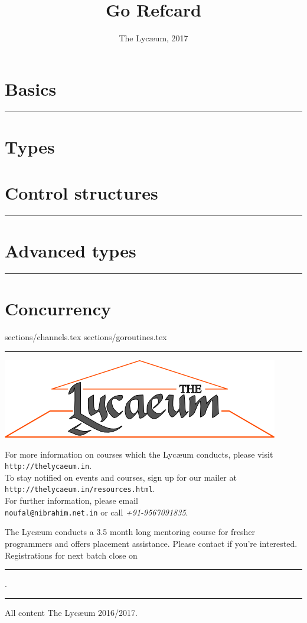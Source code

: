 \documentclass{../refsheet}
\title{Go Refcard}
\author{The Lyc\ae{}um, 2017}
\date{}
\begin{document}
\maketitle
\section{Basics}





\noindent\rule{\linewidth}{0.05ex}
\section{Types}


\section{Control structures}





\noindent\rule{\linewidth}{0.05ex}
\section{Advanced types}




\noindent\rule{\linewidth}{0.05ex}
\section{Concurrency}
 {sections/channels.tex}
 {sections/goroutines.tex}

\noindent\rule{\linewidth}{0.05ex}
\begin{center}
\includegraphics[scale=0.4]{../images/parthenon-callig.png}
\end{center}
For more information on courses which the Lyc\ae{}um conducts, please
visit \texttt{http://thelycaeum.in}. \\To stay notified on events and
courses, sign up for our mailer at \texttt{http://thelycaeum.in/resources.html}. \\For further
information, please email \\\texttt{noufal@nibrahim.net.in} or call
\textit{+91-9567091835}.
\vspace{0.5cm}

The Lyc\ae{}um conducts a 3.5 month long mentoring course for fresher
programmers and offers placement assistance. Please contact if you're
interested. Registrations for next batch close on \rule{4cm}{0.1ex}.

\textcolor{lightgray}{\noindent\rule{\linewidth}{0.05ex}}
\footnotesize All content \textcopyright The Lyc\ae{}um 2016/2017. \tiny
\end{document}
